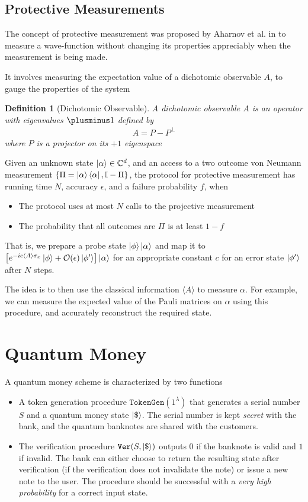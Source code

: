 \documentclass[]{article}
\newtheorem{definition}{Definition}
\newcommand*{\dollar}{\$}
\newcommand*{\pm}{\plusminus}
\newcommand*{\E}[1]{\langle #1 \rangle}
\begin{document}
\subsection{Protective Measurements}\label{sec:pm}
The concept of protective measurement was proposed by Aharnov et al. in \cite{PM} to measure a wave-function without changing its properties appreciably when the measurement is being made.

It involves measuring the expectation value of a dichotomic observable $A$, to gauge the properties of the system

\begin{definition}[Dichotomic Observable]
    A dichotomic observable $A$ is an operator with eigenvalues $\pm 1$ defined by
    \begin{align}
        A = P - P^\perp
    \end{align}
    where $P$ is a projector on its $+1$ eigenspace
\end{definition}

Given an unknown state $\ket{\alpha} \in \mathbb C^d$, and an access to a two outcome von Neumann measurement $\{\Pi = \ket{\alpha}\bra{\alpha}, \mathbb I - \Pi\}$, the protocol for protective measurement has running time $N$, accuracy $\epsilon$, and a failure probability $f$, when
\begin{itemize}
    \item The protocol uses at most $N$ calls to the projective measurement
    \item The probability that all outcomes are $\Pi$ is at least $1 - f$
\end{itemize}

That is, we prepare a probe state $\ket{\phi}\ket{\alpha}$ and map it to $\left[e^{-i c \E{A} \sigma_x} \ket{\phi} + \mathcal O(\epsilon) \ket{\phi'}\right]\ket{\alpha}$ for an appropriate constant $c$ for an error state $\ket{\phi'}$ after $N$ steps. 

The idea is to then use the classical information $\E{A}$ to measure $\alpha$. For example, we can measure the expected value of the Pauli matrices on $\alpha$ using this procedure, and accurately reconstruct the required state.

\section{Quantum Money}
A quantum money scheme is characterized by two functions
\begin{itemize}
    \item A token generation procedure $\texttt{TokenGen}(1^\lambda)$ that generates a serial number $S$ and a quantum money state $\ket{\dollar}$. The serial number is kept \textit{secret} with the bank, and the quantum banknotes are shared with the customers.
    \item The verification procedure $\texttt{Ver}(S, \ket{\dollar})$ outputs $0$ if the banknote is valid and $1$ if invalid. The bank can either choose to return the resulting state after verification (if the verification does not invalidate the note) or issue a new note to the user. The procedure should be successful with a \textit{very high probability} for a correct input state.
\end{itemize}
\end{document}
